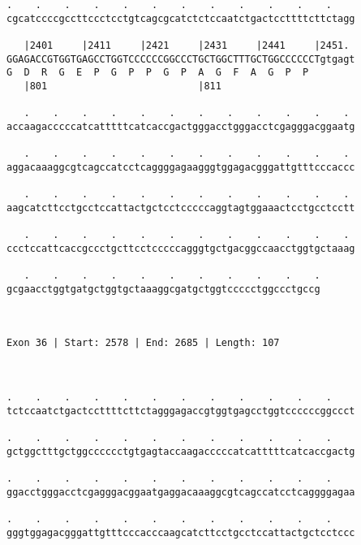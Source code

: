 \documentclass{article}
\begin{document}
\begin{Verbatim}
.    .    .    .    .    .    .    .    .    .    .    .    
cgcatccccgccttccctcctgtcagcgcatctctccaatctgactccttttcttctagg
                                                            
   |2401     |2411     |2421     |2431     |2441     |2451. 
GGAGACCGTGGTGAGCCTGGTCCCCCCGGCCCTGCTGGCTTTGCTGGCCCCCCTgtgagt
G  D  R  G  E  P  G  P  P  G  P  A  G  F  A  G  P  P        
   |801                          |811                       
  
   .    .    .    .    .    .    .    .    .    .    .    . 
accaagacccccatcatttttcatcaccgactgggacctgggacctcgagggacggaatg
                                                            
   .    .    .    .    .    .    .    .    .    .    .    . 
aggacaaaggcgtcagccatcctcaggggagaagggtggagacgggattgtttcccaccc
                                                            
   .    .    .    .    .    .    .    .    .    .    .    . 
aagcatcttcctgcctccattactgctcctcccccaggtagtggaaactcctgcctcctt
                                                            
   .    .    .    .    .    .    .    .    .    .    .    . 
ccctccattcaccgccctgcttcctcccccagggtgctgacggccaacctggtgctaaag
                                                            
   .    .    .    .    .    .    .    .    .    .    .
gcgaacctggtgatgctggtgctaaaggcgatgctggtccccctggccctgccg
                                                      
                                                      
 
Exon 36 | Start: 2578 | End: 2685 | Length: 107



.    .    .    .    .    .    .    .    .    .    .    .    
tctccaatctgactccttttcttctagggagaccgtggtgagcctggtccccccggccct
                                                            
.    .    .    .    .    .    .    .    .    .    .    .    
gctggctttgctggcccccctgtgagtaccaagacccccatcatttttcatcaccgactg
                                                            
.    .    .    .    .    .    .    .    .    .    .    .    
ggacctgggacctcgagggacggaatgaggacaaaggcgtcagccatcctcaggggagaa
                                                            
.    .    .    .    .    .    .    .    .    .    .    .    
gggtggagacgggattgtttcccacccaagcatcttcctgcctccattactgctcctccc
                                                            

\end{Verbatim}
\end{document}
